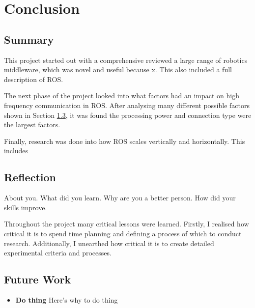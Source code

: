 \documentclass[../dissertation.tex]{subfiles}
\begin{document}
\chapter{Conclusion}
\label{conclusion-chapter}

\section{Summary}





This project started out with a comprehensive reviewed a large range of robotics middleware, which was novel and useful because x. This also included a full description of ROS.

The next phase of the project looked into what factors had an impact on high frequency communication in ROS. After analysing many different possible factors shown in Section \ref{}, it was found the processing power and connection type were the largest factors.

Finally, research was done into how ROS scales vertically and horizontally. This includes 


\section{Reflection}

About you. What did you learn. Why are you a better person. How did your skills improve. 

Throughout the project many critical lessons were learned. Firstly, I realised how critical it is to spend time planning and defining a process of which to conduct research. Additionally, I unearthed how critical it is to create detailed experimental criteria and processes. 

\section{Future Work} %

\begin{itemize}

	\item \textbf{Do thing} Here's why to do thing

\end{itemize}

\end{document}

